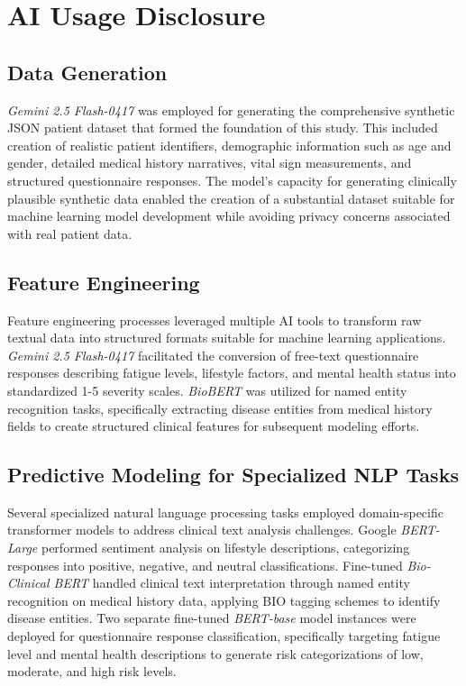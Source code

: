 \section{AI Usage Disclosure}

\subsection{Data Generation}

\textit{Gemini 2.5 Flash-0417} \parencite{Doshi_2025} was employed for generating the comprehensive synthetic JSON patient dataset that formed the foundation of this study. This included creation of realistic patient identifiers, demographic information such as age and gender, detailed medical history narratives, vital sign measurements, and structured questionnaire responses. The model's capacity for generating clinically plausible synthetic data enabled the creation of a substantial dataset suitable for machine learning model development while avoiding privacy concerns associated with real patient data.

\subsection{Feature Engineering}

Feature engineering processes leveraged multiple AI tools to transform raw textual data into structured formats suitable for machine learning applications. \textit{Gemini 2.5 Flash-0417} \parencite{Doshi_2025} facilitated the conversion of free-text questionnaire responses describing fatigue levels, lifestyle factors, and mental health status into standardized 1-5 severity scales. \textit{BioBERT} \parencite{Lee_2019} was utilized for named entity recognition tasks, specifically extracting disease entities from medical history fields to create structured clinical features for subsequent modeling efforts.

\subsection{Predictive Modeling for Specialized NLP Tasks}

Several specialized natural language processing tasks employed domain-specific transformer models to address clinical text analysis challenges. Google \textit{BERT-Large} \parencite{devlin2019bertpretrainingdeepbidirectional} performed sentiment analysis on lifestyle descriptions, categorizing responses into positive, negative, and neutral classifications. Fine-tuned \textit{Bio-Clinical BERT} \parencite{ling2023bioclinicalbertbertbase} handled clinical text interpretation through named entity recognition on medical history data, applying BIO tagging schemes to identify disease entities. Two separate fine-tuned \textit{BERT-base} model instances were deployed for questionnaire response classification, specifically targeting fatigue level and mental health descriptions to generate risk categorizations of low, moderate, and high risk levels.

